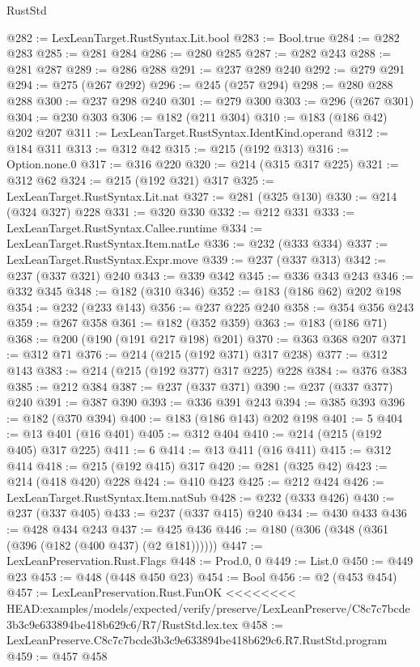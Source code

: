 \begin{lexlean}{RustStd}
\begin{coremodule}
{\begin{coremodule}
{{{{{{{{{@282 := LexLeanTarget.RustSyntax.Lit.bool
@283 := Bool.true
@284 := @282 @283
@285 := @281 @284
@286 := @280 @285
@287 := @282 @243
@288 := @281 @287
@289 := @286 @288
@291 := @237 @289 @240
@292 := @279 @291
@294 := @275 (@267 @292)
@296 := @245 (@257 @294)
@298 := @280 @288 @288
@300 := @237 @298 @240
@301 := @279 @300
@303 := @296 (@267 @301)
@304 := @230 @303
@306 := @182 (@211 @304)
@310 := @183 (@186 @42) @202 @207
@311 := LexLeanTarget.RustSyntax.IdentKind.operand
@312 := @184 @311
@313 := @312 @42
@315 := @215 (@192 @313)
@316 := Option.none.{0}
@317 := @316 @220
@320 := @214 (@315 @317 @225)
@321 := @312 @62
@324 := @215 (@192 @321) @317
@325 := LexLeanTarget.RustSyntax.Lit.nat
@327 := @281 (@325 @130)
@330 := @214 (@324 @327) @228
@331 := @320 @330
@332 := @212 @331
@333 := LexLeanTarget.RustSyntax.Callee.runtime
@334 := LexLeanTarget.RustSyntax.Item.natLe
@336 := @232 (@333 @334)
@337 := LexLeanTarget.RustSyntax.Expr.move
@339 := @237 (@337 @313)
@342 := @237 (@337 @321) @240
@343 := @339 @342
@345 := @336 @343 @243
@346 := @332 @345
@348 := @182 (@310 @346)
@352 := @183 (@186 @62) @202 @198
@354 := @232 (@233 @143)
@356 := @237 @225 @240
@358 := @354 @356 @243
@359 := @267 @358
@361 := @182 (@352 @359)
@363 := @183 (@186 @71)
@368 := @200 (@190 (@191 @217 @198) @201)
@370 := @363 @368 @207
@371 := @312 @71
@376 := @214 (@215 (@192 @371) @317 @238)
@377 := @312 @143
@383 := @214 (@215 (@192 @377) @317 @225) @228
@384 := @376 @383
@385 := @212 @384
@387 := @237 (@337 @371)
@390 := @237 (@337 @377) @240
@391 := @387 @390
@393 := @336 @391 @243
@394 := @385 @393
@396 := @182 (@370 @394)
@400 := @183 (@186 @143) @202 @198
@401 := 5
@404 := @13 @401 (@16 @401)
@405 := @312 @404
@410 := @214 (@215 (@192 @405) @317 @225)
@411 := 6
@414 := @13 @411 (@16 @411)
@415 := @312 @414
@418 := @215 (@192 @415) @317
@420 := @281 (@325 @42)
@423 := @214 (@418 @420) @228
@424 := @410 @423
@425 := @212 @424
@426 := LexLeanTarget.RustSyntax.Item.natSub
@428 := @232 (@333 @426)
@430 := @237 (@337 @405)
@433 := @237 (@337 @415) @240
@434 := @430 @433
@436 := @428 @434 @243
@437 := @425 @436
@446 := @180 (@306 (@348 (@361 (@396 (@182 (@400 @437) (@2 @181))))))
@447 := LexLeanPreservation.Rust.Flags
@448 := Prod.{0, 0}
@449 := List.{0}
@450 := @449 @23
@453 := @448 (@448 @450 @23)
@454 := Bool
@456 := @2 (@453 @454)
@457 := LexLeanPreservation.Rust.FunOK
<<<<<<<< HEAD:examples/models/expected/verify/preserve/LexLeanPreserve/C8c7c7bcde3b3c9e633894be418b629c6/R7/RustStd.lex.tex
@458 := LexLeanPreserve.C8c7c7bcde3b3c9e633894be418b629c6.R7.RustStd.program
@459 := @457 @458
}}}}}}}}}
\end{coremodule}}
\end{coremodule}
\end{lexlean}
